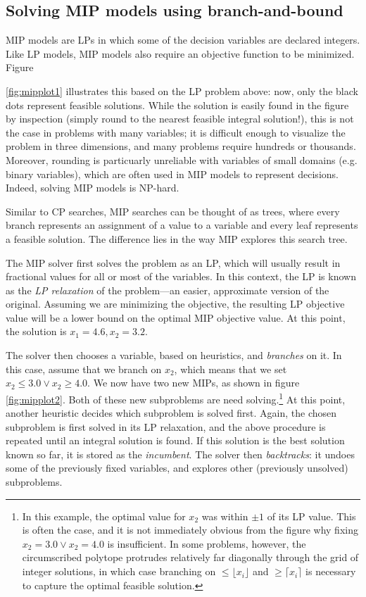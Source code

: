 \documentclass[13pt, letterpaper, oneside]{book}
\begin{document}
\subsection{Solving MIP models using branch-and-bound}
MIP models are LPs in which some of the decision variables are declared
integers. Like LP models, MIP models also require an
objective function to be minimized. Figure

\ref{fig:mipplot1} illustrates this based on the LP problem above: now, only the
black dots represent feasible solutions. While the solution is easily found in
the figure by inspection (simply round to the nearest feasible integral
solution!), this is not the case in problems with many variables; it is
difficult enough to visualize the problem in three dimensions, and many problems
require hundreds or thousands. Moreover, rounding is particuarly unreliable 
with variables of small domains (e.g. binary variables), which are often used in
MIP models to represent decisions. Indeed, solving MIP models is NP-hard.

Similar to CP searches, MIP searches can be thought of as trees, where every
branch represents an assignment of a value to a variable and every leaf represents
a feasible solution. The difference lies in the way MIP explores this search tree.

The MIP solver first solves the problem as an LP, which will usually result in
fractional values for all or most of the variables. In this context, the LP is
known as the \textit{LP relaxation} of the problem---an easier, approximate
version of the original. Assuming we are minimizing the objective, the resulting
LP objective value will be a lower bound on the optimal MIP objective value.
At this point, the solution is $x_1 = 4.6, x_2 = 3.2$.

The solver then chooses a variable, based on heuristics, and \textit{branches}
on it. In this case, assume that we branch on $x_2$, which means that we set
$x_2 \leq 3.0 \lor x_2 \geq 4.0$. We now have two new MIPs, as shown in figure
\ref{fig:mipplot2}. Both of these new subproblems are need solving.\footnote{In
this example, the optimal value for $x_2$ was
within $\pm1$ of its LP value.  This is often the case, and it is not
immediately obvious from the figure why fixing $x_2 = 3.0 \lor x_2 = 4.0$ is
insufficient. In some problems, however, the circumscribed polytope protrudes
relatively far diagonally through the grid of integer solutions, in which case
branching on $\leq \lfloor x_i \rfloor$ and $\geq \lceil x_i \rceil$ is
necessary to capture the optimal feasible solution.} At
this point, another heuristic decides which subproblem is solved first.
Again, the chosen subproblem is first solved in its LP relaxation, and the above
procedure is repeated until an integral solution is found. If this solution is
the best solution known so far, it is stored as the \textit{incumbent}. The
solver then \textit{backtracks}: it undoes some of the previously fixed variables,
and explores other (previously unsolved) subproblems.
\end{document}
